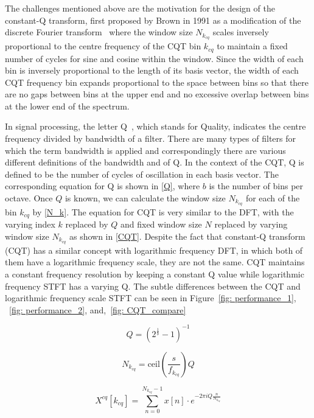 \documentclass{ieeeaccess}
\begin{document}
The challenges mentioned above are the motivation for the design of the constant-Q transform, first proposed by Brown in 1991 as a modification of the discrete Fourier transform~\cite{brown1991calculation} where the window size $N_{k_{cq}}$ scales inversely proportional to the centre frequency of the CQT bin $k_{cq}$ to maintain a fixed number of cycles for sine and cosine within the window. Since the width of each bin is inversely proportional to the length of its basis vector, the width of each CQT frequency bin expands proportional to the space between bins so that there are no gaps between bins at the upper end and no excessive overlap between bins at the lower end of the spectrum.


In signal processing, the letter Q~\cite{q-factor}, which stands for Quality, indicates the centre frequency divided by bandwidth of a filter. There are many types of filters for which the term bandwidth is applied and correspondingly there are various different definitions of the bandwidth and of Q. In the context of the CQT, Q is defined to be the number of cycles of oscillation in each basis vector. The corresponding equation for Q is shown in \eqref{Q}, where $b$ is the number of bins per octave. Once $Q$ is known, we can calculate the window size $N_{k_{cq}}$ for each of the bin $k_{cq}$ by \eqref{N_k}. The equation for CQT is very similar to the DFT, with the varying index $k$ replaced by $Q$ and fixed window size $N$ replaced by varying window size $N_{k_{cq}}$ as shown in \eqref{CQT}. Despite the fact that constant-Q transform (CQT) has a similar concept with logarithmic frequency DFT, in which both of them have a logarithmic frequency scale, they are not the same. CQT maintains a constant frequency resolution by keeping a constant Q value while logarithmic frequency STFT has a varying Q. The subtle differences between the CQT and logarithmic frequency scale STFT can be seen in Figure~\ref{fig: performance_1}, ~\ref{fig: performance_2}, and,~\ref{fig: CQT_compare}

\begin{equation}
    Q=(2^{\frac{1}{b}}-1)^{-1}
    \label{Q}
\end{equation}

\begin{equation}
    N_{k_{cq}}=   \text{ceil}{\left(\frac{s}{f_{k_{cq}}}\right)Q}
    \label{N_k}
\end{equation}

\begin{equation}
    X^{cq}[k_{cq}]= \sum_{n=0}^{N_{k_{cq}}-1}x[n]\cdot e^{-2\pi i Q \frac{n}{N_{k_{cq}}}}
    \label{CQT}
\end{equation}
\end{document}
